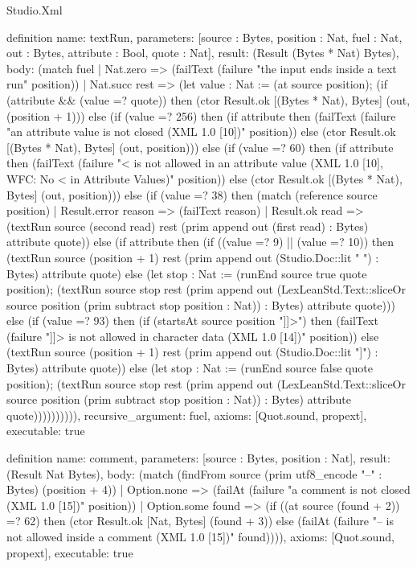 \begin{lexlean}{Studio.Xml}
\begin{semanticmodule}
definition{
  name: textRun,
  parameters: [source : Bytes, position : Nat, fuel : Nat, out : Bytes, attribute : Bool, quote : Nat],
  result: (Result (Bytes * Nat) Bytes),
  body: (match fuel
    | Nat.zero => (failText (failure "the input ends inside a text run" position))
    | Nat.succ rest => (let value : Nat := (at source position); (if (attribute && (value =? quote)) then (ctor Result.ok [(Bytes * Nat), Bytes] (out, (position + 1))) else (if (value =? 256) then (if attribute then (failText (failure "an attribute value is not closed (XML 1.0 [10])" position)) else (ctor Result.ok [(Bytes * Nat), Bytes] (out, position))) else (if (value =? 60) then (if attribute then (failText (failure "< is not allowed in an attribute value (XML 1.0 [10], WFC: No < in Attribute Values)" position)) else (ctor Result.ok [(Bytes * Nat), Bytes] (out, position))) else (if (value =? 38) then (match (reference source position)
      | Result.error reason => (failText reason)
      | Result.ok read => (textRun source (second read) rest (prim append out (first read) : Bytes) attribute quote)) else (if attribute then (if ((value =? 9) || (value =? 10)) then (textRun source (position + 1) rest (prim append out (Studio.Doc::lit " ") : Bytes) attribute quote) else (let stop : Nat := (runEnd source true quote position); (textRun source stop rest (prim append out (LexLeanStd.Text::sliceOr source position (prim subtract stop position : Nat)) : Bytes) attribute quote))) else (if (value =? 93) then (if (startsAt source position "]]>") then (failText (failure "]]> is not allowed in character data (XML 1.0 [14])" position)) else (textRun source (position + 1) rest (prim append out (Studio.Doc::lit "]") : Bytes) attribute quote)) else (let stop : Nat := (runEnd source false quote position); (textRun source stop rest (prim append out (LexLeanStd.Text::sliceOr source position (prim subtract stop position : Nat)) : Bytes) attribute quote)))))))))),
  recursive_argument: fuel,
  axioms: [Quot.sound, propext],
  executable: true
}

definition{
  name: comment,
  parameters: [source : Bytes, position : Nat],
  result: (Result Nat Bytes),
  body: (match (findFrom source (prim utf8_encode "--" : Bytes) (position + 4))
    | Option.none => (failAt (failure "a comment is not closed (XML 1.0 [15])" position))
    | Option.some found => (if ((at source (found + 2)) =? 62) then (ctor Result.ok [Nat, Bytes] (found + 3)) else (failAt (failure "-- is not allowed inside a comment (XML 1.0 [15])" found)))),
  axioms: [Quot.sound, propext],
  executable: true
}


\end{semanticmodule}
\end{lexlean}

